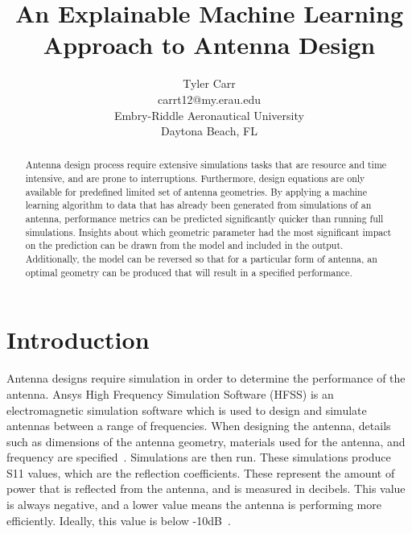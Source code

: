 \documentclass[lettersize,journal]{IEEEtran}
\begin{document}
\title{An Explainable Machine Learning Approach to Antenna Design}

\author{Tyler Carr \\ carrt12@my.erau.edu \\ Embry-Riddle Aeronautical University \\ Daytona Beach, FL}

\maketitle

\begin{abstract}
Antenna design process require extensive simulations tasks that are resource and time intensive, and are prone to interruptions. Furthermore, design equations are only available for predefined limited set of antenna geometries. By applying a machine learning algorithm to data that has already been generated from simulations of an antenna, performance metrics can be predicted significantly quicker than running full simulations. Insights about which geometric parameter had the most significant impact on the prediction can be drawn from the model and included in the output. Additionally, the model can be reversed so that for a particular form of antenna, an optimal geometry can be produced that will result in a specified performance. 
\end{abstract}

\section{Introduction}
Antenna designs require simulation in order to determine the performance of the antenna. Ansys High Frequency Simulation Software (HFSS) is an electromagnetic simulation software which is used to design and simulate antennas between a range of frequencies. When designing the antenna, details such as dimensions of the antenna geometry, materials used for the antenna, and frequency are specified~\cite{Maxworth_2022}. Simulations are then run. These simulations produce S11 values, which are the reflection coefficients. These represent the amount of power that is reflected from the antenna, and is measured in decibels. This value is always negative, and a lower value means the antenna is performing more efficiently. Ideally, this value is below -10dB~\cite{Bevelacqua_2015}.
\end{document}

